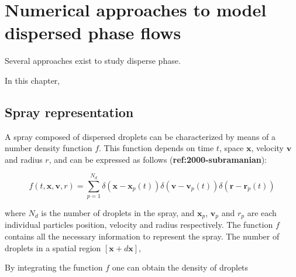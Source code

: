 \section{Numerical approaches to model dispersed phase flows}




Several approaches exist to study disperse phase. 





In this chapter, 

\subsection{Spray representation}

A spray composed of dispersed droplets can be characterized by means of a number density function $f$. This function depends on time $t$, space $\textbf{x}$, velocity $\textbf{v}$ and radius $r$, and can be expressed as follows (\textbf{ref:2000-subramanian}):

\begin{equation}
f \left( t, \textbf{x}, \textbf{v}, r \right) = \sum_{p=1}^{N_d} \delta \left( \textbf{x} - \textbf{x}_p \left( t \right) \right)  \delta \left( \textbf{v} - \textbf{v}_p \left( t \right) \right) \delta \left( \textbf{r} - \textbf{r}_p \left( t \right) \right)
\end{equation}

where $N_d$ is the number of droplets in the spray, and $\textbf{x}_p$, $\textbf{v}_p$ and $r_p$ are each individual particles position, velocity and radius respectively. The function $f$ contains all the necessary information to represent the spray. The number of droplets in a spatial region $\left[ \textbf{x} + d\textbf{x} \right]$, 

By integrating the function $f$ one can obtain the density of droplets 



